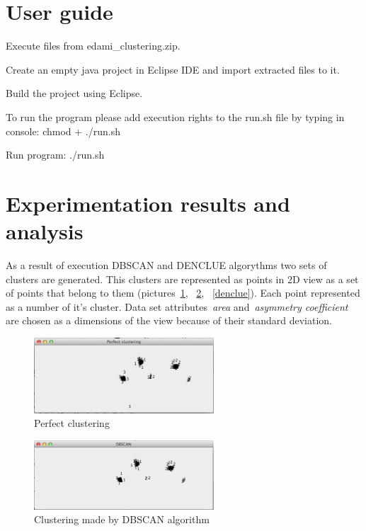 \documentclass[12pt, a4paper, notitlepage, oneside]{article}
\begin{document}
\section*{User guide}


Execute files from edami\_clustering.zip.


\noindent 
Create an empty java project in Eclipse IDE and import extracted files to it. 

\noindent 
Build the project using Eclipse.

\noindent 
To run the program please add execution rights to the run.sh file by typing in console: 
	chmod + ./run.sh 


\noindent 
Run program:
 ./run.sh


\cleardoublepage

\section*{Experimentation results and analysis}

As a result of execution DBSCAN and DENCLUE algorythms two sets of clusters are generated. This clusters are represented as points in 2D view as a set of points that belong to them (pictures~\ref{perfect}, ~\ref{dbscan}, ~\ref{denclue}). Each point represented as a number of it’s cluster. Data set attributes~\textit{area} and~\textit{asymmetry coefficient} are chosen as a dimensions of the view because of their standard deviation. 

\begin{figure}[!ht]
 	\centering
	\includegraphics[width=0.6\textwidth]{images/perfect.png}
 	\caption[]
	{Perfect clustering}
	\label{perfect}
	\end{figure}

\begin{figure}[!ht]
 	\centering
	\includegraphics[width=0.6\textwidth]{images/dbscan.png}
 	\caption[]
	{Clustering made by DBSCAN algorithm}
	\label{dbscan}
	\end{figure}
\end{document}
